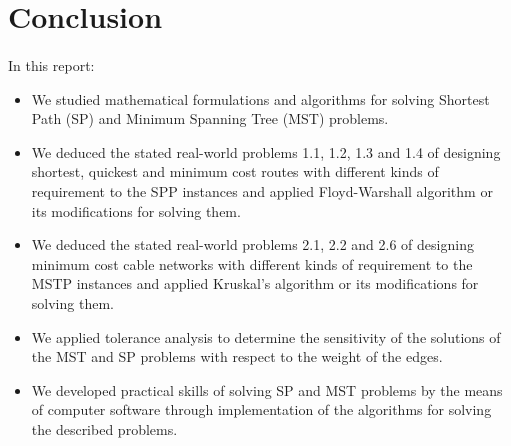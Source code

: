 \section{Conclusion}
	\paragraph{}
	In this report:
\begin{itemize}
	\item We studied mathematical formulations and algorithms for solving Shortest Path (SP) and Minimum Spanning Tree (MST) problems.
	\item We deduced the stated real-world problems 1.1, 1.2, 1.3 and 1.4 of designing shortest, quickest and minimum cost routes with different kinds of requirement  to the SPP instances and applied Floyd-Warshall algorithm or its modifications for solving them.
	\item We deduced the stated real-world problems 2.1, 2.2 and 2.6 of designing minimum cost cable networks with different kinds of requirement  to the MSTP instances and applied Kruskal's algorithm or its modifications for solving them.
	\item We applied tolerance analysis to determine the sensitivity of the solutions of the MST and SP problems with respect to the weight of the edges.
	\item We developed practical skills of solving SP and MST problems by the means of computer software through implementation of the algorithms for solving the described problems.
\end{itemize}
